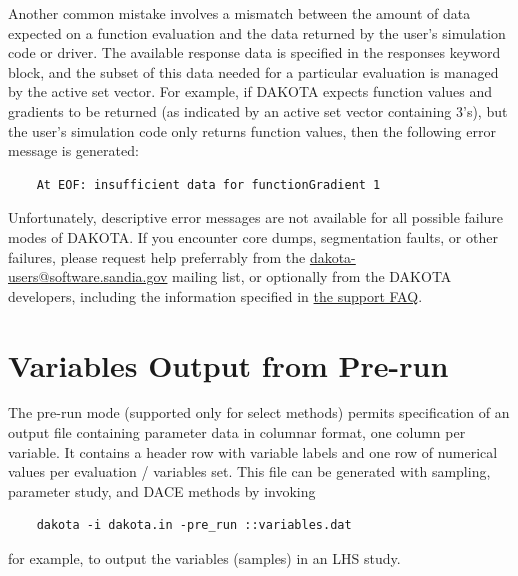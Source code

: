 Another common mistake involves a mismatch between the amount of data
expected on a function evaluation and the data returned by the user's
simulation code or driver. The available response data is specified in
the responses keyword block, and the subset of this data needed for a
particular evaluation is managed by the active set vector. For
example, if DAKOTA expects function values and gradients to be
returned (as indicated by an active set vector containing 3's), but
the user's simulation code only returns function values, then the
following error message is generated:
\begin{small}
\begin{verbatim}
    At EOF: insufficient data for functionGradient 1
\end{verbatim}
\end{small}

Unfortunately, descriptive error messages are not available for all
possible failure modes of DAKOTA. If you encounter core dumps,
segmentation faults, or other failures, please request help
preferrably from the
\href{mailto:dakota-users@software.sandia.gov}{dakota-users@software.sandia.gov}
mailing list, or optionally from the DAKOTA developers, including the
information specified in
\href{http://dakota.sandia.gov/faq.html#S2}{the support FAQ}.


\section{Variables Output from Pre-run}

The pre-run mode (supported only for select methods) permits
specification of an output file containing parameter data in columnar
format, one column per variable.  It contains a header row with
variable labels and one row of numerical values per evaluation /
variables set.  This file can be generated with sampling, parameter
study, and DACE methods by invoking
\begin{small}
\begin{verbatim}
    dakota -i dakota.in -pre_run ::variables.dat
\end{verbatim}
\end{small}
for example, to output the variables (samples) in an LHS study.
